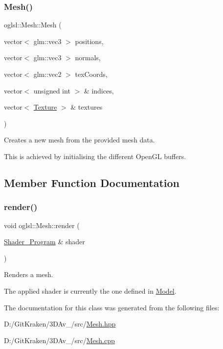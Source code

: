 \subsubsection{\texorpdfstring{Mesh()}{Mesh()}}
{\footnotesize\ttfamily oglsl\+::\+Mesh\+::\+Mesh (\begin{DoxyParamCaption}\item[{vector$<$ glm\+::vec3 $>$}]{positions,  }\item[{vector$<$ glm\+::vec3 $>$}]{normals,  }\item[{vector$<$ glm\+::vec2 $>$}]{tex\+Coords,  }\item[{vector$<$ unsigned int $>$ \&}]{indices,  }\item[{vector$<$ \mbox{\hyperlink{namespaceoglsl_a3f3bf2d9553fda1a155d7492ee30d7d0}{Texture}} $>$ \&}]{textures }\end{DoxyParamCaption})}



Creates a new mesh from the provided mesh data. 

This is achieved by initialising the different Open\+GL buffers. 

\subsection{Member Function Documentation}
\mbox{\label{classoglsl_1_1_mesh_a358dea364d978e49c8df22fa9ad62c21}} 
\subsubsection{\texorpdfstring{render()}{render()}}
{\footnotesize\ttfamily void oglsl\+::\+Mesh\+::render (\begin{DoxyParamCaption}\item[{\mbox{\hyperlink{classoglsl_1_1_shader___program}{Shader\+\_\+\+Program}} \&}]{shader }\end{DoxyParamCaption})}



Renders a mesh. 

The applied shader is currently the one defined in \mbox{\hyperlink{classoglsl_1_1_model}{Model}}. 

The documentation for this class was generated from the following files\+:\begin{DoxyCompactItemize}
\item 
D\+:/\+Git\+Kraken/3\+D\+Av\+\_/src/\mbox{\hyperlink{_mesh_8hpp}{Mesh.\+hpp}}\item 
D\+:/\+Git\+Kraken/3\+D\+Av\+\_/src/\mbox{\hyperlink{_mesh_8cpp}{Mesh.\+cpp}}\end{DoxyCompactItemize}
